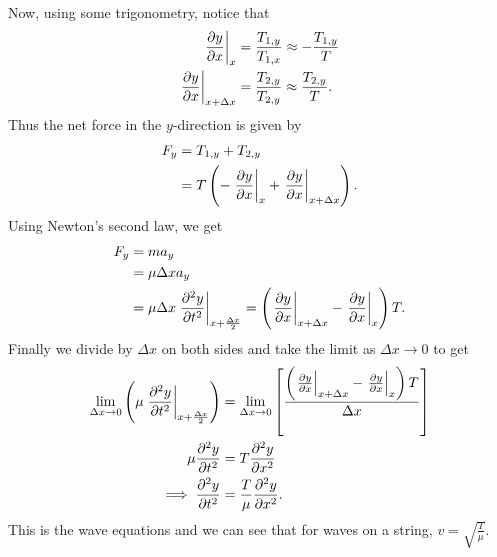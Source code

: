 \documentclass[../classical_mechanics.tex]{subfiles}
\begin{document}
        \paragraph{}
        Now, using some trigonometry, notice that
        \begin{align}
            \left.\pdv{y}{x}\right|_x&=\frac{T_{1,y}}{T_{1,x}}\approx -\frac{T_{1,y}}{T}\\
            \left.\pdv{y}{x}\right|_{x+\Delta x}&=\frac{T_{2,y}}{T_{2,y}}\approx\frac{T_{2,y}}{T}.
        \end{align}
        Thus the net force in the $y$-direction is given by
        \begin{align}
            F_y&=T_{1,y}+T_{2,y}\\
            &=T\left(-\left.\pdv{y}{x}\right|_x+\left.\pdv{y}{x}\right|_{x+\Delta x}\right).
        \end{align}
        Using Newton's second law, we get
        \begin{align}
            F_y&=ma_y\\
            &=\mu\Delta xa_y\\
            &=\mu\Delta x\left.\pdv[2]{y}{t}\right|_{x+\frac{\Delta x}{2}}=\left(\left.\pdv{y}{x}\right|_{x+\Delta x}-\left.\pdv{y}{x}\right|_x\right)T.
        \end{align}
        Finally we divide by $\Delta x$ on both sides and take the limit as $\Delta x\to0$ to get
        \begin{align}
            \lim_{\Delta x\to0}\left(\mu\left.\pdv[2]{y}{t}\right|_{x+\frac{\Delta x}{2}}\right)&=\lim_{\Delta x\to0}\left[\frac{\left(\left.\pdv{y}{x}\right|_{x+\Delta x}-\left.\pdv{y}{x}\right|_x\right)T}{\Delta x}\right]\\
            \mu\pdv[2]{y}{t}&=T\pdv[2]{y}{x}\\
            \implies\pdv[2]{y}{t}&=\frac{T}{\mu}\pdv[2]{y}{x}.
        \end{align}
        This is the wave equations and we can see that for waves on a string, $v=\sqrt{\frac{T}{\mu}}$.
\end{document}
